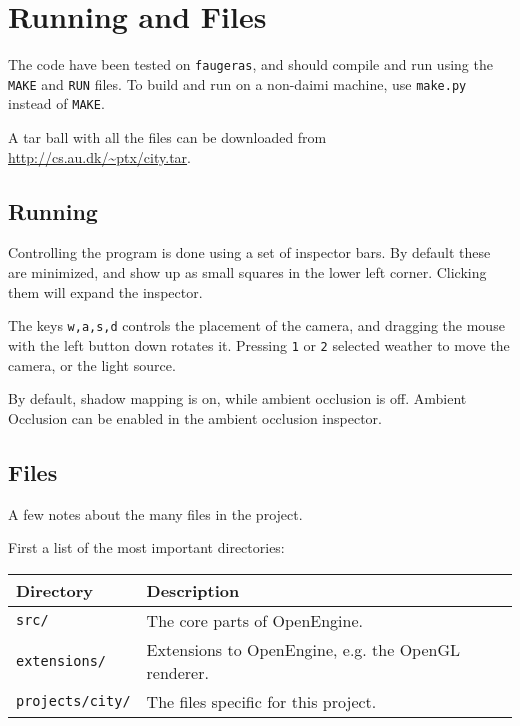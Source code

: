 
\section{Running and Files}

The code have been tested on \texttt{faugeras}, and should compile and
run using the \texttt{MAKE} and \texttt{RUN} files. To build and run
on a non-daimi machine, use \texttt{make.py} instead of \texttt{MAKE}.

A tar ball with all the files can be downloaded from
\url{http://cs.au.dk/~ptx/city.tar}.



\subsection{Running}

Controlling the program is done using a set of inspector bars. By
default these are minimized, and show up as small squares in the lower
left corner. Clicking them will expand the inspector.

The keys \texttt{w,a,s,d} controls the placement of the camera, and
dragging the mouse with the left button down rotates it. Pressing
\texttt{1} or \texttt{2} selected weather to move the camera, or the
light source.

By default, shadow mapping is on, while ambient occlusion is
off. Ambient Occlusion can be enabled in the ambient occlusion
inspector.

\subsection{Files}
\label{sec:files}
A few notes about the many files in the project.

First a list of the most important directories:

\begin{center} 
  \begin{tabular}{|l|l|}
    \hline 
    \textbf{Directory} & \textbf{Description} \\ \hline 
    \texttt{src/} & The core parts of OpenEngine. \\ \hline
    \texttt{extensions/} & Extensions to OpenEngine, e.g. the OpenGL renderer. \\ \hline
    \texttt{projects/city/} & The files specific for this project. \\ \hline
  \end{tabular}
\end{center}

